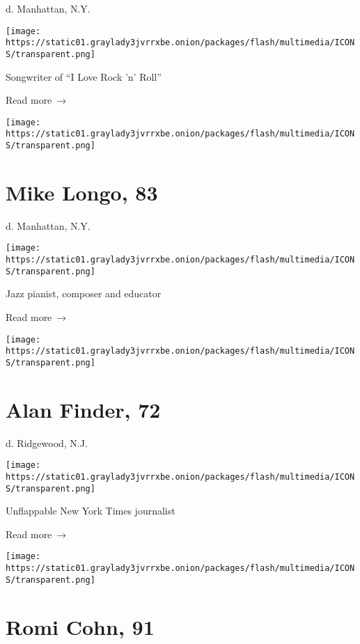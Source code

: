 d. Manhattan, N.Y.

\texttt{[image: https://static01.graylady3jvrrxbe.onion/packages/flash/multimedia/ICONS/transparent.png]}

Songwriter of ``I Love Rock 'n' Roll''

 Read more~→

\href{https://www.nytimes3xbfgragh.onion/2020/03/28/arts/music/mike-longo-dead-coronavirus.html}{}

\texttt{[image: https://static01.graylady3jvrrxbe.onion/packages/flash/multimedia/ICONS/transparent.png]}

\hypertarget{mike-longo-83}{%
\section{Mike Longo, 83}\label{mike-longo-83}}

d. Manhattan, N.Y.

\texttt{[image: https://static01.graylady3jvrrxbe.onion/packages/flash/multimedia/ICONS/transparent.png]}

Jazz pianist, composer and educator

 Read more~→

\href{https://www.nytimes3xbfgragh.onion/2020/03/27/obituaries/alan-finder-dead-coronavirus.html}{}

\texttt{[image: https://static01.graylady3jvrrxbe.onion/packages/flash/multimedia/ICONS/transparent.png]}

\hypertarget{alan-finder-72}{%
\section{Alan Finder, 72}\label{alan-finder-72}}

d. Ridgewood, N.J.

\texttt{[image: https://static01.graylady3jvrrxbe.onion/packages/flash/multimedia/ICONS/transparent.png]}

Unflappable New York Times journalist

 Read more~→

\href{https://www.nytimes3xbfgragh.onion/2020/03/27/obituaries/romi-cohn-dead-coronavirus.html}{}

\texttt{[image: https://static01.graylady3jvrrxbe.onion/packages/flash/multimedia/ICONS/transparent.png]}

\hypertarget{romi-cohn-91}{%
\section{Romi Cohn, 91}\label{romi-cohn-91}}

